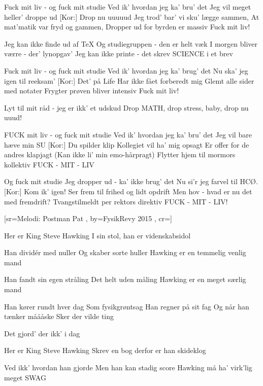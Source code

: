 \documentclass[pdftex,12pt]{article}
\begin{document}
\begin{songs}{}
\beginverse
Fuck mit liv - og fuck mit studie
Ved ik' hvordan jeg ka' bru' det
Jeg vil meget heller' droppe ud
[Kor:] Drop nu uuuuud
Jeg trod' bar' vi sku' lægge sammen,
At mat'matik var fryd og gammen,
Dropper ud for byrden er massiv
Fuck mit liv!
\endverse

\beginverse
Jeg kan ikke finde ud af \TeX
Og studiegruppen - den er helt væk
I morgen bliver værre - der' lynopgav'
Jeg kan ikke printe - det skrev SCIENCE i et brev
\endverse

\beginverse
Fuck mit liv - og fuck mit studie
Ved ik' hvordan jeg ka' brug' det
Nu ska' jeg igen til reeksam'
[Kor:] Det' på Life
Har ikke fået forberedt mig
Glemt alle sider med notater
Frygter prøven bliver intensiv
Fuck mit liv!
\endverse

\beginverse
Lyt til mit råd - jeg er ikk' et udskud
Drop MATH, drop stress, baby, drop nu uuud!
\endverse

\beginverse
FUCK mit liv - og fuck mit studie
Ved ik' hvordan jeg ka' bru' det
Jeg vil bare hæve min SU
[Kor:] Du spilder klip
Kollegiet vil ha' mig opsagt
Er offer for de andres klapjagt (Kan ikke li' min emo-hårpragt)
Flytter hjem til mormors kollektiv
FUCK - MIT - LIV
\endverse

\beginverse
Og fuck mit studie
Jeg dropper ud - ka' ikke brug' det
Nu si'r jeg farvel til HCØ.
[Kor:] Kom ik' igen!
Ser frem til frihed og lidt opdrift
Men hov - hvad er nu det med fremdrift?
Tvangstilmeldt per rektors direktiv
FUCK - MIT - LIV!
\endverse
\endsong



[sr={Melodi: Postman Pat}
,
by={FysikRevy 2015}
,
cr={}]\hypertarget{Steve Hawking}{}
\label{song15}

\beginverse
Her er King
Steve Hawking
I sin stol, han er videnskabsidol

\endverse
\beginverse
Han dividér med nuller
Og skaber sorte huller
Hawking er en temmelig venlig mand

\endverse
\beginverse
Han fandt sin egen stråling
Det helt uden måling
Hawking er en meget særlig mand

\endverse
\beginverse
Han kører rundt hver dag
Som fysikgrøntsag
Han regner på sit fag
Og når han tænker måååske
Sker der vilde ting

\endverse
\beginverse
Det gjord' der ikk' i dag

\endverse
\beginverse
Her er King
Steve Hawking
Skrev en bog derfor er han skideklog

\endverse
\beginverse
Ved ikk' hvordan han gjorde
Men han kan stadig score
Hawking må ha' virk'lig meget SWAG


\end{songs}
\end{document}

